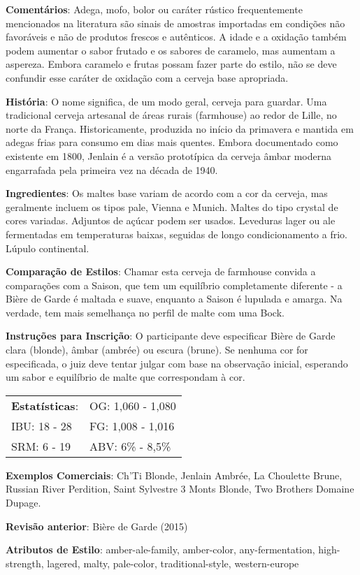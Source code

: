 \textbf{Comentários}: Adega, mofo, bolor ou caráter rústico frequentemente mencionados na literatura são sinais de amostras importadas em condições não favoráveis e não de produtos frescos e autênticos. A idade e a oxidação também podem aumentar o sabor frutado e os sabores de caramelo, mas aumentam a aspereza. Embora caramelo e frutas possam fazer parte do estilo, não se deve confundir esse caráter de oxidação com a cerveja base apropriada.

\textbf{História}: O nome significa, de um modo geral, cerveja para guardar. Uma tradicional cerveja artesanal de áreas rurais (farmhouse) ao redor de Lille, no norte da França. Historicamente, produzida no início da primavera e mantida em adegas frias para consumo em dias mais quentes. Embora documentado como existente em 1800, Jenlain é a versão prototípica da cerveja âmbar moderna engarrafada pela primeira vez na década de 1940.

\textbf{Ingredientes}: Os maltes base variam de acordo com a cor da cerveja, mas geralmente incluem os tipos pale, Vienna e Munich. Maltes do tipo crystal de cores variadas. Adjuntos de açúcar podem ser usados. Leveduras lager ou ale fermentadas em temperaturas baixas, seguidas de longo condicionamento a frio. Lúpulo continental.

\textbf{Comparação de Estilos}: Chamar esta cerveja de farmhouse convida a comparações com a Saison, que tem um equilíbrio completamente diferente - a Bière de Garde é maltada e suave, enquanto a Saison é lupulada e amarga. Na verdade, tem mais semelhança no perfil de malte com uma Bock.

\textbf{Instruções para Inscrição}: O participante deve especificar Bière de Garde clara (blonde), âmbar (ambrée) ou escura (brune). Se nenhuma cor for especificada, o juiz deve tentar julgar com base na observação inicial, esperando um sabor e equilíbrio de malte que correspondam à cor.

\begin{tabular}{@{}p{35mm}p{35mm}@{}}
  \textbf{Estatísticas}: & OG: 1,060 - 1,080 \\
  IBU: 18 - 28  & FG: 1,008 - 1,016  \\
  SRM: 6 - 19  & ABV: 6\% - 8,5\%
\end{tabular}

\textbf{Exemplos Comerciais}: Ch’Ti Blonde, Jenlain Ambrée, La Choulette Brune, Russian River Perdition, Saint Sylvestre 3 Monts Blonde, Two Brothers Domaine Dupage.

\textbf{Revisão anterior}: Bière de Garde (2015)

\textbf{Atributos de Estilo}: amber-ale-family, amber-color, any-fermentation, high-strength, lagered, malty, pale-color, traditional-style, western-europe
